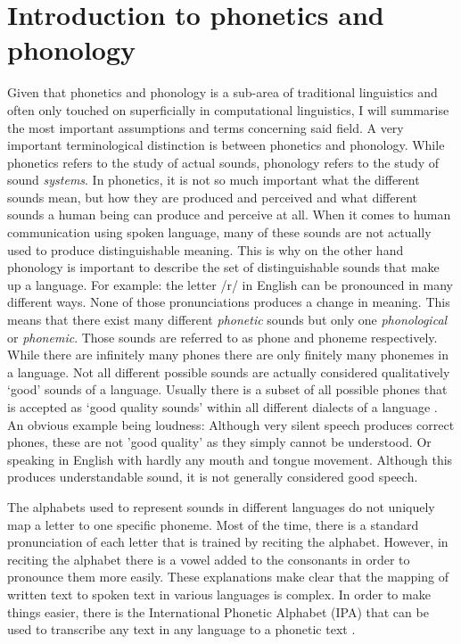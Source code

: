 \section{Introduction to phonetics and phonology}
\label{phonology}
Given that phonetics and phonology is a sub-area of traditional linguistics and often only touched on superficially in computational linguistics, I will summarise the most important assumptions and terms concerning said field. A very important terminological distinction is between phonetics and phonology. While phonetics refers to the study of actual sounds, phonology refers to the study of sound \textit{systems}. In phonetics, it is not so much important what the different sounds mean, but how they are produced and perceived and what different sounds a human being can produce and perceive at all. When it comes to human communication using spoken language, many of these sounds are not actually used to produce distinguishable meaning. This is why on the other hand phonology is important to describe the set of distinguishable sounds that make up a language. For example: the letter /r/ in English can be pronounced in many different ways. None of those pronunciations produces a change in meaning. This means that there exist many different \textit{phonetic} sounds but only one \textit{phonological} or \textit{phonemic}. Those sounds are referred to as phone and phoneme respectively. While there are infinitely many phones there are only finitely many phonemes in a language. Not all different possible sounds are actually considered qualitatively `good' sounds of a language. Usually there is a subset of all possible phones that is accepted as `good quality sounds' within all different dialects of a language \citep{Intro.2007}. An obvious example being loudness: Although very silent speech produces correct phones, these are not 'good quality' as they simply cannot be understood. Or speaking in English with hardly any mouth and tongue movement. Although this produces understandable sound, it is not generally considered good speech. 

The alphabets used to represent sounds in different languages do not uniquely map a letter to one specific phoneme. Most of the time, there is a standard pronunciation of each letter that is trained by reciting the alphabet. However, in reciting the alphabet there is a vowel added to the consonants in order to pronounce them more easily. These explanations make clear that the mapping of written text to spoken text in various languages is complex. In order to make things easier, there is the International Phonetic Alphabet (IPA) that can be used to transcribe any text in any language to a phonetic text \citep{Intro.2007}. 


